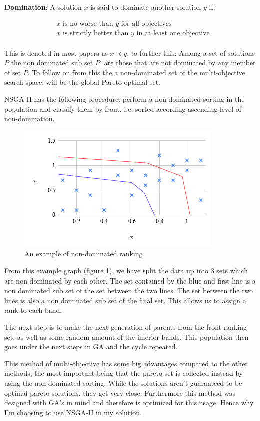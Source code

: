 \documentclass[11pt]{article}
\begin{document}
    \textbf{Domination}: A solution \(x\) is said to dominate another solution \(y\) if:

    \begin{align*}
        & x \text{ is no worse than } y \text{ for all objectives} \\
        & x \text{ is strictly better than } y \text{ in at least one objective} \\
    \end{align*}

    This is denoted in most papers as \(x \prec y\), to further this: Among a set of solutions \(P\)
    the non dominated sub set \(P'\) are those that are not dominated by any member of
    set \(P\). To follow on from this the a non-dominated set of the multi-objective search
    space, will be the global Pareto optimal set.

    NSGA-II has the following procedure: perform a non-dominated sorting in the population
    and classify them by front. i.e. sorted according ascending level of non-domination.

    \begin{figure}[H]
        \centering
        \includegraphics[width=.6\textwidth]{NSGArank}
        \caption{An example of non-dominated ranking}\label{fig:NSGArank}
    \end{figure}
    From this example graph (figure \ref{fig:NSGArank}), we have split the data up into 3 sets
    which are non-dominated
    by each other. The set contained by the blue and first line is a non dominated sub set
    of the set between the two lines. The set between the two lines is also a non dominated
    sub set of the final set. This allows us to assign a rank to each band.

    The next step is to make the next generation of parents from the front ranking
    set, as well as some random amount of the inferior bands. This population
    then goes under the next steps in GA and the cycle repeated.

    This method of multi-objective has some big advantages compared to the other methods,
    the most important being that the pareto set is collected instead by using the non-dominated
    sorting. While the solutions aren't guaranteed to be optimal pareto solutions, they
    get very close. Furthermore this method was designed with GA's in mind and therefore is
    optimized for this usage. Hence why I'm choosing to use NSGA-II in my solution.
\end{document}
